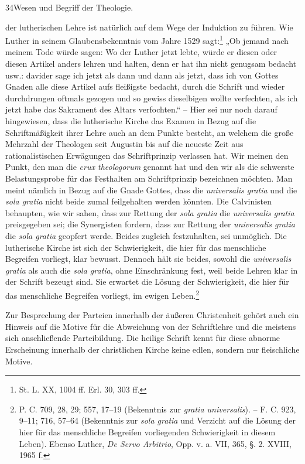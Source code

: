 34\hfill Wesen und Begriff der Theologie.\par der lutherischen Lehre ist natürlich auf dem Wege der Induktion zu führen. Wie Luther in seinem Glaubensbekenntnis vom Jahre 1529 sagt:\footnote{St. L. XX, 1004 ff. Erl. 30, 303 ff.} „Ob jemand nach meinem Tode würde sagen: Wo der Luther jetzt lebte, würde er diesen oder diesen Artikel anders lehren und halten, denn er hat ihn nicht genugsam bedacht usw.: davider sage ich jetzt als dann und dann als jetzt, dass ich von Gottes Gnaden alle diese Artikel aufs fleißigste bedacht, durch die Schrift und wieder durchdrungen oftmals gezogen und so gewiss dieselbigen wollte verfechten, als ich jetzt habe das Sakrament des Altars verfochten.“ -- Hier sei nur noch darauf hingewiesen, dass die lutherische Kirche das Examen in Bezug auf die Schriftmäßigkeit ihrer Lehre auch an dem Punkte besteht, an welchem die große Mehrzahl der Theologen seit Augustin bis auf die neueste Zeit aus rationalistischen Erwägungen das Schriftprinzip verlassen hat. Wir meinen den Punkt, den man die \textit{crux theologorum} genannt hat und den wir als die schwerste Belastungsprobe für das Festhalten am Schriftprinzip bezeichnen möchten. Man meint nämlich in Bezug auf die Gnade Gottes, dass die \textit{universalis gratia} und die \textit{sola gratia} nicht beide zumal feilgehalten werden könnten. Die Calvinisten behaupten, wie wir sahen, dass zur Rettung der \textit{sola gratia} die \textit{universalis gratia} preisgegeben sei; die Synergisten fordern, dass zur Rettung der \textit{universalis gratia} die \textit{sola gratia} geopfert werde. Beides zugleich festzuhalten, sei unmöglich. Die lutherische Kirche ist sich der Schwierigkeit, die hier für das menschliche Begreifen vorliegt, klar bewusst. Dennoch hält sie beides, sowohl die \textit{universalis gratia} als auch die \textit{sola gratia}, ohne Einschränkung fest, weil beide Lehren klar in der Schrift bezeugt sind. Sie erwartet die Lösung der Schwierigkeit, die hier für das menschliche Begreifen vorliegt, im ewigen Leben.\footnote{P. C. 709, 28, 29; 557, 17--19 (Bekenntnis zur \textit{gratia universalis}). -- F. C. 923, 9--11; 716, 57--64 (Bekenntnis zur \textit{sola gratia} und Verzicht auf die Lösung der hier für das menschliche Begreifen vorliegenden Schwierigkeit in diesem Leben). Ebenso Luther, \textit{De Servo Arbitrio}, Opp. v. a. VII, 365, \S. 2. XVIII, 1965 f.}\par Zur Besprechung der Parteien innerhalb der äußeren Christenheit gehört auch ein Hinweis auf die Motive für die Abweichung von der Schriftlehre und die meistens sich anschließende Parteibildung. Die heilige Schrift kennt für diese abnorme Erscheinung innerhalb der christlichen Kirche keine edlen, sondern nur fleischliche Motive.